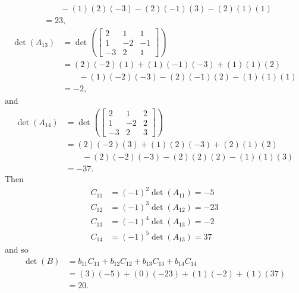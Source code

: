 \begin{example}
\begin{align*}
	&\qquad - (1)(2)(-3)-(2)(-1)(3)-(2)(1)(1) \\
	&= 23,
\end{align*}
\begin{align*}
\det(A_{13}) &=  \det\left(\left[ \begin{array}{rrr}  2&1&1 \\ 1&-2&-1 \\ -3&2&1  \end{array} \right] \right) \\
	&= (2)(-2)(1)+(1)(-1)(-3)+(1)(1)(2) \\
	&\qquad - (1)(-2)(-3)-(2)(-1)(2)-(1)(1)(1) \\
	&= -2,
\end{align*}
and 
\begin{align*}
\det(A_{14}) &=  \det\left(\left[ \begin{array}{rrc}  2&1&2 \\ 1&-2&2 \\ -3&2&3  \end{array} \right] \right) \\
	&= (2)(-2)(3)+(1)(2)(-3)+(2)(1)(2) \\
	&\qquad - (2)(-2)(-3)-(2)(2)(2)-(1)(1)(3) \\
	&= -37.
\end{align*}
Then
\begin{align*}
C_{11} &= (-1)^2 \det(A_{11}) = -5 \\
C_{12} &= (-1)^3 \det(A_{12})= -23 \\
C_{13} &= (-1)^4 \det(A_{13}) = -2 \\
C_{14} &= (-1)^5 \det(A_{13}) = 37
\end{align*}
and so 
\begin{align*}
\det(B) &= b_{11}C_{11} + b_{12}C_{12} + b_{13}C_{13} + b_{14}C_{14} \\
	&= (3)(-5) +(0)(-23) +(1)(-2)+ (1)(37) \\
	&= 20.
\end{align*}

\ea

\end{example}

